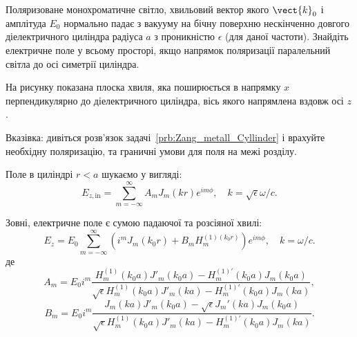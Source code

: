 \begin{problem}%
Поляризоване монохроматичне світло, хвильовий вектор якого $\vect{k}_0$  і амплітуда $E_0$ нормально падає з вакууму на бічну поверхню нескінченно довгого діелектричного циліндра радіуса $a$ з проникністю $\epsilon$ (для даної частоти). Знайдіть електричне поле у всьому просторі, якщо напрямок поляризації паралельний світла до осі симетрії циліндра.
\begin{solution}
На рисунку показана плоска хвиля, яка поширюється в напрямку $x$ перпендикулярно до діелектричного циліндра, вісь якого напрямлена вздовж осі $z$.

	\begin{center}
	\end{center}

	Вказівка: дивіться розв'язок задачі~\ref{prb:Zang_metall_Cyllinder} і врахуйте необхідну поляризацію, та граничні умови для поля на межі розділу.

	Поле в циліндрі $r < a$ шукаємо у вигляді:
	\[
		E_{z,\text{in}} = \sum\limits_{m = -\infty}^{\infty}A_mJ_m(kr)e^{im\phi}, \quad k=\sqrt{\epsilon} \omega/c.
	\]

	Зовні, електричне поле є сумою падаючої та розсіяної хвилі:
	\[
		E_z = E_0 \sum\limits_{m = -\infty}^{\infty} \left( i^m J_m(k_0 r) + B_m H_m^{(1)(k_0r)} \right) e^{im\phi}, \quad k= \omega/c.
	\]
	де
	\[
		A_m = E_0i^m \frac{  H_m^{(1)}(k_0a) J'_m(k_0a) - H_m^{(1)\prime}(k_0a) J_m(k_0a)    }{ \sqrt{\epsilon} H_m^{(1)}(k_0a) J'_m(ka) - H_m^{(1)\prime}(k_0a) J_m(ka)},
	\]
	\[
		B_m = E_0i^m \frac{  J_m(ka) J'_m(k_0a) - \sqrt{\epsilon} J_m'(ka) J_m(k_0a)    }{ \sqrt{\epsilon} H_m^{(1)}(k_0a) J'_m(ka) - H_m^{(1)\prime}(k_0a) J_m(ka)}.
	\]

\end{solution}
\end{problem}

